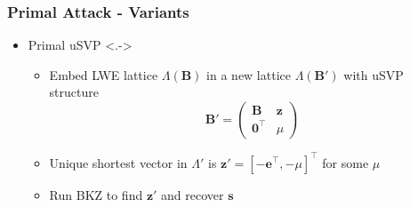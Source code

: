 \documentclass[t, aspectratio=169]{beamer}
\begin{document}
\begin{frame}
    \frametitle{Primal Attack - Variants}
    \begin{itemize}[<+->]
        \item Primal uSVP \only<.->{}
              \begin{itemize}[<+->]
                  \item Embed LWE lattice $\Lambda(\mathbf{B})$ in a new lattice $\Lambda(\mathbf{B}')$ with uSVP structure %
                        \begin{equation*}
                            \mathbf{B}' = \begin{pmatrix}
                                \mathbf{B}           & \mathbf{z} \\
                                \mathbf{0}^\intercal & \mu
                            \end{pmatrix}
                        \end{equation*}
                  \item Unique shortest vector in $\Lambda'$ is $\mathbf{z}' = \left[-\mathbf{e}^\intercal, -\mu\right]^\intercal$ for some $\mu$ %
                  \item Run BKZ to find $\mathbf{z}'$ and recover $\mathbf{s}$ %
              \end{itemize}
    \end{itemize}
\end{frame}
\end{document}
